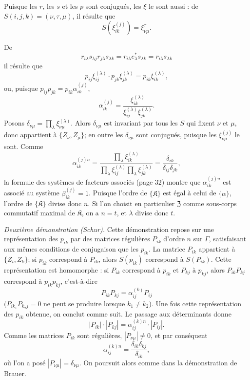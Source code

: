 Puisque les \(r\), les \(s\) et les \(p\) sont conjugués, les \(\xi\) le sont aussi : de \(S(i,j,k)=(\nu,\tau,\mu)\), il résulte que
\[
S(\xi_{ik}^{(j)})=\xi_{\nu\mu}^{\tau}.
\]

De
\[
r_{i\lambda}s_{\lambda j}r_{j\lambda}s_{\lambda k}
=r_{i\lambda}e_\lambda^*s_{\lambda k}
=r_{i\lambda}s_{\lambda k}
\]
il résulte que
\[
p_{ij}\xi_{ij}^{(\lambda)}\cdot p_{jk}\xi_{jk}^{(\lambda)}
=p_{ik}\xi_{ik}^{(\lambda)},
\]
ou, puisque \(p_{ij}p_{jk}=p_{ik}\alpha_{ik}^{(j)}\),
\[
\alpha_{ik}^{(j)}
=\frac{\xi_{ik}^{(\lambda)}}{\xi_{ij}^{(\lambda)}\xi_{jk}^{(\lambda)}}.
\]
Posons \(\delta_{\nu\mu}=\prod_{\lambda}\xi_{\nu\mu}^{(\lambda)}\). Alors \(\delta_{\nu\mu}\) est invariant par tous les \(S\) qui fixent \(\nu\) et \(\mu\), donc appartient à \(\{Z_\nu,Z_\mu\}\); en outre les \(\delta_{\nu\mu}\) sont conjugués, puisque les \(\xi_{\nu\mu}^{(j)}\) le sont. Comme
\[
\alpha_{ik}^{(j)n}
=\frac{\prod_{\lambda}\xi_{ik}^{(\lambda)}}
       {\prod_{\lambda}\xi_{ij}^{(\lambda)}\prod_{\lambda}\xi_{jk}^{(\lambda)}}
=\frac{\delta_{ik}}{\delta_{ij}\delta_{jk}},
\]
la formule des systèmes de facteurs associés (page 32) montre que \(\alpha_{ik}^{(j)n}\) est associé au système \(\beta_{ik}^{(j)}=1\). Puisque l'ordre de \(\{\mathfrak K\}\) est égal à celui de \(\{\alpha\}\), l'ordre de \(\{\mathfrak K\}\) divise donc \(n\). Si l'on choisit en particulier \(\mathfrak Z\) comme sous-corps commutatif maximal de \(\mathfrak K\), on a \(n=t\), et \(\lambda\) divise donc \(t\).

\emph{Deuxième démonstration (Schur).} Cette démonstration repose sur une représentation des \(p_{ik}\) par des matrices régulières \(P_{ik}\) d'ordre \(n\) sur \(\Gamma\), satisfaisant aux mêmes conditions de conjugaison que les \(p_{ik}\). La matrice \(P_{ik}\) appartient à \(\{Z_i,Z_k\}\); si \(p_{ik}\) correspond à \(P_{ik}\), alors \(S(p_{ik})\) correspond à \(S(P_{ik})\). Cette représentation est homomorphe : si \(P_{ik}\) correspond à \(p_{ik}\) et \(P_{kj}\) à \(p_{kj}\), alors \(P_{ik}P_{kj}\) correspond à \(p_{ik}p_{kj}\), c'est-à-dire
\[
P_{ik}P_{kj}=\alpha_{ij}^{(k)}P_{ij}
\]
\((P_{ik_1}P_{k_2j}=0\) ne peut se produire lorsque \(k_1\neq k_2\)). Une fois cette représentation des \(p_{ik}\) obtenue, on conclut comme suit. Le passage aux déterminants donne
\[
|P_{ik}|\cdot |P_{kj}|=\alpha_{ij}^{(k)n}\cdot |P_{ij}|.
\]
Comme les matrices \(P_{ik}\) sont régulières, \(|P_{\nu\mu}|\ne0\), et par conséquent
\[
\alpha_{ij}^{(k)n}=\frac{\delta_{ik}\delta_{kj}}{\delta_{ik}},
\]
où l'on a posé \(|P_{\nu\mu}|=\delta_{\nu\mu}\). On poursuit alors comme dans la démonstration de Brauer.

